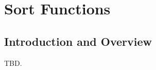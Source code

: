 \chapter[Sort Functions]
        {Sort Functions}

\label{csol0}

\section{Introduction and Overview}
\label{csol0:siov0}

TBD.

